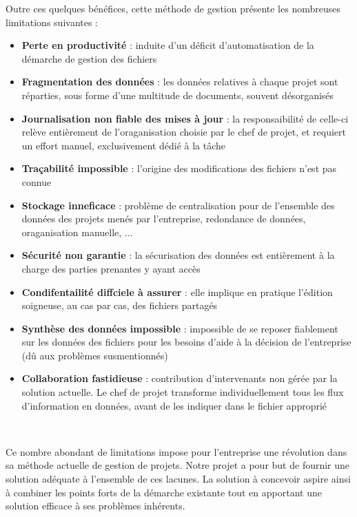 \begin{spacing}{1.5}
Outre ces quelques bénéfices, cette méthode de gestion présente les nombreuses limitations suivantes :
\begin{itemize}
    \item \textbf{Perte en productivité} : induite d'un déficit d'automatisation de la démarche de gestion des fichiers
    \item \textbf{Fragmentation des données} : les données relatives à chaque projet sont réparties, sous forme d'une multitude de documents, souvent désorganisés
    \item \textbf{Journalisation non fiable des mises à jour} : la responsaibilité de celle-ci relève entièrement de l'oraganisation choisie par le chef de projet, et requiert un effort manuel, exclusivement dédié à la tâche
    \item \textbf{Traçabilité impossible} : l'origine des modifications des fichiers n'est pas connue
    \item \textbf{Stockage inneficace} : problème de centralisation pour de l'ensemble des données des projets menés par l'entreprise, redondance de données, oraganisation manuelle, ...
    \item \textbf{Sécurité non garantie} : la sécurisation des données est entièrement à la charge des parties prenantes y ayant accès
    \item \textbf{Condifentailité diffciele à assurer} : elle implique en pratique l'édition soigneuse, au cas par cas, des fichiers partagés
    \item \textbf{Synthèse des données impossible} : impossible de se reposer fiablement sur les données des fichiers pour les besoins d'aide à la décision de l'entreprise (dû aux problèmes susmentionnés)
    \item \textbf{Collaboration fastidieuse} : contribution d'intervenants non gérée par la solution actuelle. Le chef de projet transforme individuellement tous les flux d'information en données, avant de les indiquer dans le fichier approprié
\end{itemize}
\

Ce nombre abondant de limitations impose pour l'entreprise une révolution dans sa méthode actuelle de gestion de projets. Notre projet a pour but de fournir une solution adéquate à l'ensemble de ces lacunes. La solution à concevoir aspire ainsi à combiner les points forts de la démarche existante tout en apportant une solution efficace à ses problèmes inhérents.



\end{spacing}
